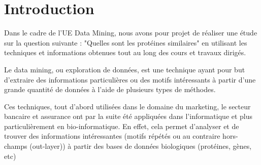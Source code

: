\section*{Introduction}


\setcounter{page}{2}


Dans le cadre de l'UE Data Mining, nous avons pour projet de réaliser une étude sur la question suivante : "Quelles sont les protéines similaires" en utilisant les techniques et informations obtenues tout au long des cours et travaux dirigés.

Le data mining, ou exploration de données, est une technique ayant pour but d'extraire des informations particulières ou des motifs intéressants à partir d'une grande quantité de données à l'aide de plusieurs types de méthodes.

Ces techniques, tout d'abord utilisées dans le domaine du marketing, le secteur bancaire et assurance ont par la suite été appliquées dans l'informatique et plus particulièrement en bio-informatique. En effet, cela permet d'analyser et de trouver des informations intéressantes (motifs répétés ou au contraire hors-champs (out-layer)) à partir des bases de données biologiques (protéines, gènes, etc)

